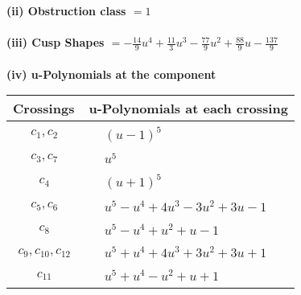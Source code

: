 \documentclass[1p]{elsarticle_modified}
\theoremstyle{definition}
\begin{document}
\flushleft \textbf{(ii) Obstruction class $= 1$}\\~\\
\flushleft \textbf{(iii) Cusp Shapes $= -\frac{14}{9} u^4+\frac{11}{3} u^3-\frac{77}{9} u^2+\frac{88}{9} u-\frac{137}{9}$}\\~\\
\newpage\renewcommand{\arraystretch}{1}
\flushleft \textbf{(iv) u-Polynomials at the component}\newline \\
\begin{tabular}{m{50pt}|m{274pt}}
Crossings & \hspace{64pt}u-Polynomials at each crossing \\
\hline $$\begin{aligned}c_{1},c_{2}\end{aligned}$$&$\begin{aligned}
&(u-1)^5
\end{aligned}$\\
\hline $$\begin{aligned}c_{3},c_{7}\end{aligned}$$&$\begin{aligned}
&u^5
\end{aligned}$\\
\hline $$\begin{aligned}c_{4}\end{aligned}$$&$\begin{aligned}
&(u+1)^5
\end{aligned}$\\
\hline $$\begin{aligned}c_{5},c_{6}\end{aligned}$$&$\begin{aligned}
&u^5- u^4+4 u^3-3 u^2+3 u-1
\end{aligned}$\\
\hline $$\begin{aligned}c_{8}\end{aligned}$$&$\begin{aligned}
&u^5- u^4+u^2+u-1
\end{aligned}$\\
\hline $$\begin{aligned}c_{9},c_{10},c_{12}\end{aligned}$$&$\begin{aligned}
&u^5+u^4+4 u^3+3 u^2+3 u+1
\end{aligned}$\\
\hline $$\begin{aligned}c_{11}\end{aligned}$$&$\begin{aligned}
&u^5+u^4- u^2+u+1
\end{aligned}$\\
\hline
\end{tabular}\\~\\
\end{document}
